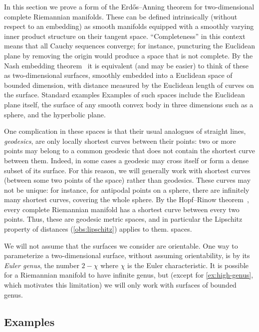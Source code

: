 \documentclass[11pt]{article}
\theoremstyle{definition}
\begin{document}
In this section we prove a form of the Erd\H{o}s--Anning theorem for two-dimensional complete Riemannian manifolds. These can be defined intrinsically (without respect to an embedding) as smooth manifolds equipped with a smoothly varying inner product structure on their tangent space. ``Completeness'' in this context means that all Cauchy sequences converge; for instance, puncturing the Euclidean plane by removing the origin would produce a space that is not complete.
\iffull
By the Nash embedding theorem~\cite{Nas-AM-56} it is equivalent (and may be easier) to think of these as two-dimensional surfaces, smoothly embedded into a Euclidean space of bounded dimension, with distance measured by the Euclidean length of curves on the surface. Standard examples
\else
Examples
\fi
of such spaces include the Euclidean plane itself, the surface of any smooth convex body in three dimensions such as a sphere, and the hyperbolic plane.

One complication in these spaces is that their usual analogues of straight lines, \emph{geodesics}, are only locally shortest curves between their points: two or more points may belong to a common geodesic that does not contain the shortest curve between them. Indeed, in some cases a geodesic may cross itself or form a dense subset of its surface. For this reason, we will generally work with shortest curves (between some two points of the space) rather than geodesics. These curves may not be unique: for instance, for antipodal points on a sphere, there are infinitely many shortest curves, covering the whole sphere. By the Hopf--Rinow theorem~\cite{HopRin-CMH-31}, every complete Riemannian manifold has a shortest curve between every two points.  Thus, these are geodesic metric 
\iffull
spaces, and in particular the Lipschitz property of distances (\cref{obs:lipschitz}) applies to them. 
\else
spaces.
\fi

We will not assume that the surfaces we consider are orientable. One way to parameterize a two-dimensional surface, without assuming orientability, is by its \emph{Euler genus}, the number $2-\chi$ where $\chi$ is the Euler characteristic. It is possible for a Riemannian manifold to have infinite genus, but (except for \cref{ex:high-genus}, which motivates this limitation) we will only work with surfaces of bounded genus.

\subsection{Examples}
\end{document}
